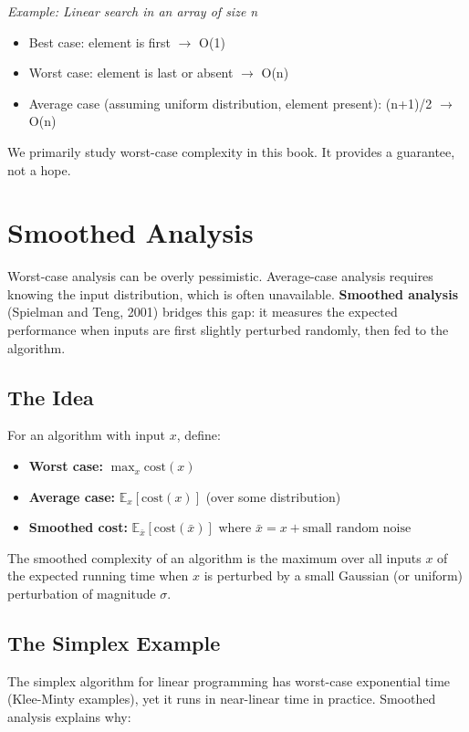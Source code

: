 \textit{Example: Linear search in an array of size n}
\begin{itemize}
\item Best case: element is first $\to $ O(1)
\item Worst case: element is last or absent $\to $ O(n)
\item Average case (assuming uniform distribution, element present): (n+1)/2 $\to $ O(n)
\end{itemize}

We primarily study worst-case complexity in this book. It provides a guarantee, not a hope.

\section{Smoothed Analysis}

Worst-case analysis can be overly pessimistic. Average-case analysis requires knowing the input distribution, which is often unavailable. \textbf{Smoothed analysis} (Spielman and Teng, 2001) bridges this gap: it measures the expected performance when inputs are first slightly perturbed randomly, then fed to the algorithm.

\subsection{The Idea}

For an algorithm with input $x$, define:
\begin{itemize}
\item \textbf{Worst case:} $\max_x \text{cost}(x)$
\item \textbf{Average case:} $\mathbb{E}_x[\text{cost}(x)]$ (over some distribution)
\item \textbf{Smoothed cost:} $\mathbb{E}_{\bar{x}}[\text{cost}(\bar{x})]$ where $\bar{x} = x + \text{small random noise}$
\end{itemize}

The smoothed complexity of an algorithm is the maximum over all inputs $x$ of the expected running time when $x$ is perturbed by a small Gaussian (or uniform) perturbation of magnitude $\sigma$.

\subsection{The Simplex Example}

The simplex algorithm for linear programming has worst-case exponential time (Klee-Minty examples), yet it runs in near-linear time in practice. Smoothed analysis explains why:

